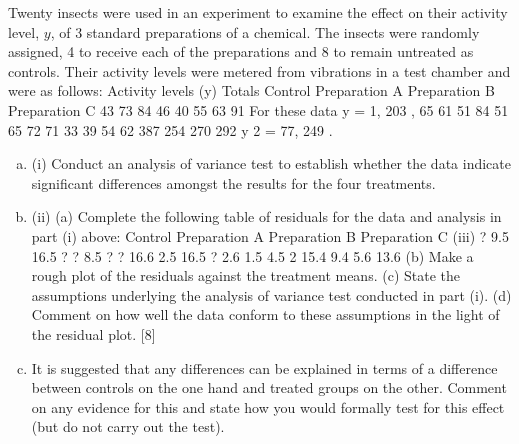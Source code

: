 \documentclass[a4paper,12pt]{article}
\begin{document}
\begin{enumerate}
Twenty insects were used in an experiment to examine the effect on their activity level, $y$, of 3 standard preparations of a chemical. The insects were randomly assigned, 4 to receive each of the preparations and 8 to remain untreated as controls.
Their activity levels were metered from vibrations in a test chamber and were as
follows:
Activity levels (y)
Totals
Control
Preparation A
Preparation B
Preparation C 43
73
84
46
40
55
63
91
For these data y = 1, 203 ,
65
61
51
84
51
65
72
71
33
39
54
62
387
254
270
292
y 2 = 77, 249 .
\begin{enumerate}[(a)]
\item (i) Conduct an analysis of variance test to establish whether the data indicate
significant differences amongst the results for the four treatments.
\item 
(ii) (a)
Complete the following table of residuals for the data and analysis in
part (i) above:
Control
Preparation A
Preparation B
Preparation C
(iii)
?
9.5
16.5
?
?
8.5
?
?
16.6
2.5
16.5
?
2.6
1.5
4.5
2
15.4
9.4
5.6 13.6
(b) Make a rough plot of the residuals against the treatment means.
(c) State the assumptions underlying the analysis of variance test
conducted in part (i).
(d) Comment on how well the data conform to these assumptions in the
light of the residual plot.
[8]
\item It is suggested that any differences can be explained in terms of a difference
between controls on the one hand and treated groups on the other.
Comment on any evidence for this and state how you would formally test for
this effect (but do not carry out the test).
\end{enumerate}

\newpage


\end{enumerate}
\end{document}
